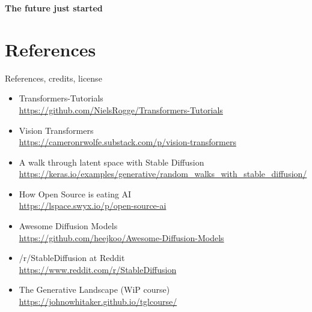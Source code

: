 \documentclass[17pt,aspectratio=169,hyperref={pdfusetitle,colorlinks,allcolors=olive}]{beamer}
\begin{document}
\begin{frame}[fragile]

  {\Large \bf
    The future just started
  }
\end{frame}

\section*{References}

\begin{frame}[fragile]

  {\huge References, credits, license}
\end{frame}

\begin{frame}[fragile]

  {\small
    \begin{itemize}
    \item Transformers-Tutorials \\
      {\scriptsize \url{https://github.com/NielsRogge/Transformers-Tutorials}}
    \item Vision Transformers \\
      {\scriptsize \url{https://cameronrwolfe.substack.com/p/vision-transformers}}
    \item A walk through latent space with Stable Diffusion \\
      {\scriptsize \url{https://keras.io/examples/generative/random_walks_with_stable_diffusion/}}
    \item How Open Source is eating AI \\
      {\scriptsize \url{https://lspace.swyx.io/p/open-source-ai}}
    \end{itemize}
  }  
\end{frame}

\begin{frame}[fragile]


  {\small
    \begin{itemize}
    \item Awesome Diffusion Models \\
      {\scriptsize \url{https://github.com/heejkoo/Awesome-Diffusion-Models}}
    \item /r/StableDiffusion at Reddit \\
      {\scriptsize \url{https://www.reddit.com/r/StableDiffusion}}
    \item The Generative Landscape (WiP course) \\
      {\scriptsize \url{https://johnowhitaker.github.io/tglcourse/}}
    \end{itemize}
  }  
\end{frame}
\end{document}
